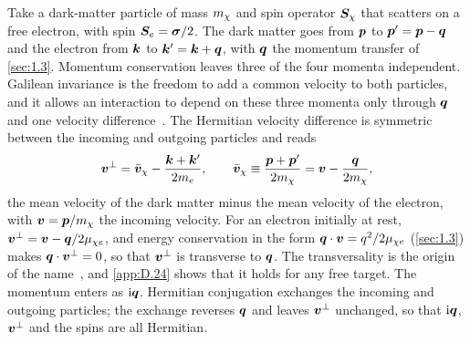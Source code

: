 Take a dark-matter particle of mass $m_{\chi}$ and spin operator $\bm{S}_\chi$ that scatters on a free electron, with spin $\bm{S}_e = \boldsymbol{\sigma}/2$. The dark matter goes from $\bm{p}$ to $\bm{p}' = \bm{p} - \bm{q}$ and the electron from $\bm{k}$ to $\bm{k}' = \bm{k} + \bm{q}$, with $\bm{q}$ the momentum transfer of \cref{sec:1.3}. Momentum conservation leaves three of the four momenta independent. Galilean invariance is the freedom to add a common velocity to both particles, and it allows an interaction to depend on these three momenta only through $\bm{q}$ and one velocity difference~\cite[Sect.~2.2]{fitzpatrick2013effective}. The Hermitian velocity difference is symmetric between the incoming and outgoing particles and reads
\begin{equation}
  \bm{v}^\perp = \bar{\bm{v}}_\chi - \frac{\bm{k} + \bm{k}'}{2m_e}, \qquad
  \bar{\bm{v}}_\chi \equiv \frac{\bm{p} + \bm{p}'}{2m_{\chi}} = \bm{v} - \frac{\bm{q}}{2m_{\chi}} ,
  \label{eq:8.1-vperp}
\end{equation}
the mean velocity of the dark matter minus the mean velocity of the electron, with $\bm{v} = \bm{p}/m_{\chi}$ the incoming velocity. For an electron initially at rest, $\bm{v}^\perp = \bm{v} - \bm{q}/2\mu_{\chi e}$, and energy conservation in the form $\bm{q}\cdot\bm{v} = q^2/2\mu_{\chi e}$ (\cref{sec:1.3}) makes $\bm{q}\cdot\bm{v}^\perp = 0$, so that $\bm{v}^\perp$ is transverse to $\bm{q}$. The transversality is the origin of the name~\cite[Eq.~(14)]{fitzpatrick2013effective}, and \cref{app:D.24} shows that it holds for any free target. The momentum enters as $\mathrm{i}\bm{q}$. Hermitian conjugation exchanges the incoming and outgoing particles; the exchange reverses $\bm{q}$ and leaves $\bm{v}^\perp$ unchanged, so that $\mathrm{i}\bm{q}$, $\bm{v}^\perp$ and the spins are all Hermitian.

